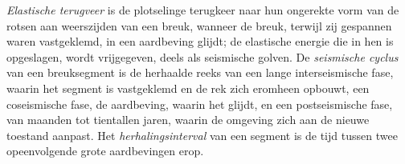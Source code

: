 \begin{definition}\label{def:b1:earthquake-source:seismic-cycle}
\emph{Elastische terugveer} is de plotselinge terugkeer naar hun ongerekte vorm van de rotsen aan weerszijden van een breuk, wanneer de breuk, terwijl zij gespannen waren vastgeklemd, in een aardbeving glijdt; de elastische energie die in hen is opgeslagen, wordt vrijgegeven, deels als seismische golven. De \emph{seismische cyclus} van een breuksegment is de herhaalde reeks van een lange interseismische fase, waarin het segment is vastgeklemd en de rek zich eromheen opbouwt, een coseismische fase, de aardbeving, waarin het glijdt, en een postseismische fase, van maanden tot tientallen jaren, waarin de omgeving zich aan de nieuwe toestand aanpast. Het \emph{herhalingsinterval} van een segment is de tijd tussen twee opeenvolgende grote aardbevingen erop.
\end{definition}

